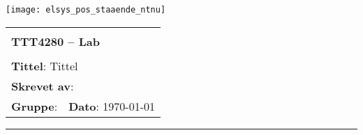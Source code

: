 \documentclass[a4paper,11pt,norsk]{article}
\begin{document}
\setcounter{page}{0}

\begin{minipage}[c]{0.15\textwidth}
\texttt{[image: elsys\_pos\_staaende\_ntnu]}  
\end{minipage}
\begin{minipage}[c]{0.85\textwidth}

\renewcommand{\arraystretch}{1.7}
\large 
\begin{tabularx}{\textwidth}{|X|X|}
\hline
\multicolumn{2}{|l|}{} \\
\multicolumn{2}{|l|}{\huge \textbf{TTT4280 -- Lab}} \\
\multicolumn{2}{|l|}{}  \\
\hline
\multicolumn{2}{|l|}{\textbf{Tittel}: 
Tittel
} \\
\hline
\multicolumn{2}{|l|}{\textbf{Skrevet av}:
} \\
\hline
\textbf{Gruppe}:  & \textbf{Dato}: \today
\\
\hline 
\end{tabularx}
\end{minipage}
\normalsize

\newpage


\pagestyle{fancy}
\fancyhf{}
\renewcommand{\footrulewidth}{0.5pt}

\clearpage

\setlength{\parskip}{1ex}
\renewcommand{\baselinestretch}{0.1}\normalsize
\tableofcontents
\renewcommand{\baselinestretch}{1.00}\normalsize
\setlength{\parskip}{2ex}
\rule{\textwidth}{0.5pt}


\newpage



{}

\begingroup
\makeatletter
\makeatother
{}


\endgroup

\nocite{*} %
\clearpage
\appendix

\end{document}
